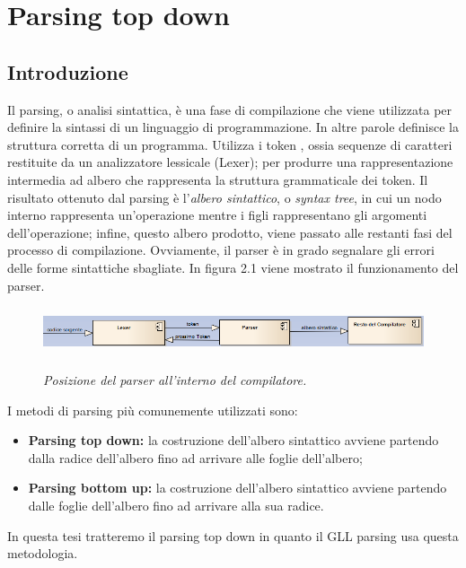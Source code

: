 \chapter{Parsing top down}
\section{Introduzione}
Il parsing, o analisi sintattica, è una fase di compilazione  che viene utilizzata per definire la sintassi di un linguaggio di programmazione. In altre parole definisce la struttura corretta di un programma. Utilizza i token \cite{libro: compilatori}, ossia sequenze di caratteri restituite da un analizzatore lessicale (Lexer); per produrre una rappresentazione intermedia ad albero che rappresenta la struttura grammaticale dei token. Il risultato ottenuto dal parsing è l'\textit{albero sintattico}, o \textit{syntax tree}, in cui un nodo interno rappresenta un'operazione mentre i figli rappresentano gli argomenti dell'operazione; infine, questo albero prodotto, viene passato alle restanti fasi del processo di compilazione. Ovviamente, il parser è in grado segnalare gli errori delle forme sintattiche sbagliate. In figura 2.1 viene mostrato il funzionamento del parser.
\par
\vspace{0.5mm}
\begin{figure}[hbpb]\label{figParser}
	{\includegraphics[height=40pt,width=420pt,scale=0.1]{files/parser.png}}
	\caption{\textit{Posizione del parser all'interno del compilatore.}}
\end{figure}
\noindent I metodi di parsing più comunemente utilizzati sono:
\begin{itemize}
	\item \textbf{Parsing top down:} la costruzione dell'albero sintattico avviene partendo dalla radice dell'albero fino ad arrivare alle foglie dell'albero;
	\item \textbf{Parsing bottom up:} la costruzione dell'albero sintattico avviene partendo dalle foglie dell'albero fino ad arrivare alla sua radice.
\end{itemize}
In questa tesi tratteremo il parsing top down in quanto il GLL parsing usa questa metodologia.
